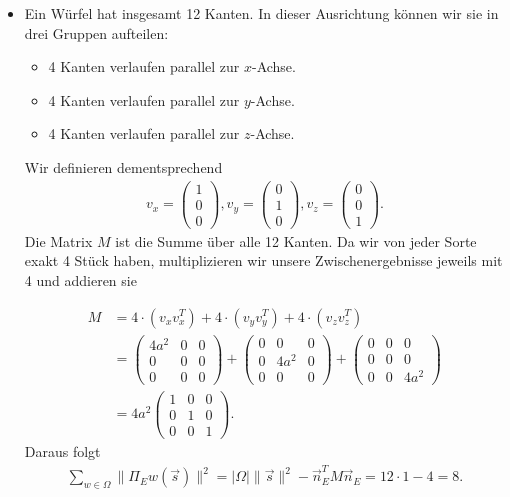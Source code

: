 \begin{itemize}
\begin{align}
\end{align}
\item[b)] Ein Würfel hat insgesamt 12 Kanten. In dieser Ausrichtung können wir sie in drei Gruppen aufteilen:
\begin{itemize}
    \item 4 Kanten verlaufen parallel zur $x$-Achse.
    \item 4 Kanten verlaufen parallel zur $y$-Achse.
    \item 4 Kanten verlaufen parallel zur $z$-Achse.
\end{itemize}
Wir definieren dementsprechend
\begin{align}
    v_x = \begin{pmatrix} 1  \\ 0  \\ 0  \end{pmatrix} , v_y = \begin{pmatrix} 0 \\ 1  \\ 0 \end{pmatrix}, v_z = \begin{pmatrix} 0  \\ 0  \\ 1  \end{pmatrix} . \nonumber
\end{align}
Die Matrix $M$ ist die Summe über alle 12 Kanten. Da wir von jeder Sorte exakt 4 Stück haben, multiplizieren wir unsere Zwischenergebnisse jeweils mit 4 und addieren sie

\begin{align}
    M &= 4 \cdot (v_x v_x^T) + 4 \cdot (v_y v_y^T) + 4 \cdot (v_z v_z^T) \nonumber \\
    &=\begin{pmatrix} 4a^2 & 0 & 0 \\ 0 & 0 & 0 \\ 0 & 0 & 0 \end{pmatrix} + \begin{pmatrix} 0 & 0 & 0 \\ 0 & 4a^2 & 0 \\ 0 & 0 & 0 \end{pmatrix} + \begin{pmatrix} 0 & 0 & 0 \\ 0 & 0 & 0 \\ 0 & 0 & 4a^2 \end{pmatrix} \nonumber \\
    &= 4a^2\begin{pmatrix} 1 & 0 & 0 \\ 0 & 1 & 0 \\ 0 & 0 & 1 \end{pmatrix}.  \nonumber
\end{align}
Daraus folgt
    \begin{align} 
        \sum_{w \in \Omega} \|\Pi_{E}w(\vec{s})\|^2 = |\Omega|  \|\vec{s}\|^2 - \vec{n}_E^TM\vec{n}_E
        = 12\cdot 1- 4 = 8 \nonumber.
    \end{align}

\end{itemize}


